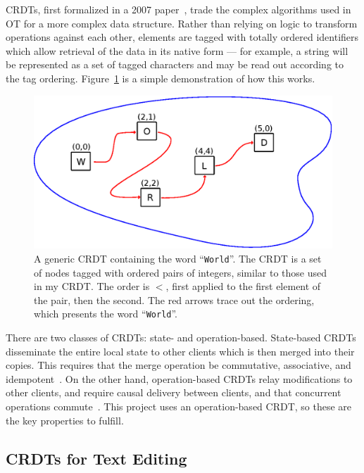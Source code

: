 \documentclass[12pt,a4paper,twoside,openright]{report}
\begin{document}
	CRDTs, first formalized in a 2007 paper~\cite{shapiro2007}, trade the complex algorithms used in OT for a more complex data structure. Rather than relying on logic to transform operations against each other, elements are tagged with totally ordered identifiers which allow retrieval of the data in its native form --- for example, a string will be represented as a set of tagged characters and may be read out according to the tag ordering. Figure~\ref{fig:taggedset} is a simple demonstration of how this works. 
	
	\begin{figure}[H]
	\centering
	\includegraphics[width=1\linewidth]{figs/tagged_set.eps}
	\caption[Text CRDT as a tagged set]{A generic CRDT containing the word ``\texttt{World}''. The CRDT is a set of nodes tagged with ordered pairs of integers, similar to those used in my CRDT. The order is $<$, first applied to the first element of the pair, then the second. The red arrows trace out the ordering, which presents the word ``\texttt{World}''.}
	\label{fig:taggedset}
	\end{figure}
	
	There are two classes of CRDTs: state- and operation-based. State-based CRDTs disseminate the entire local state to other clients which is then merged into their copies. This requires that the merge operation be commutative, associative, and idempotent~\cite{shapiro2011}. On the other hand, operation-based CRDTs relay modifications to other clients, and require causal delivery between clients, and that concurrent operations commute~\cite{takada2013}. This project uses an operation-based CRDT, so these are the key properties to fulfill.


	\subsection{CRDTs for Text Editing} \label{sec:relatedwork}
		
\end{document}
